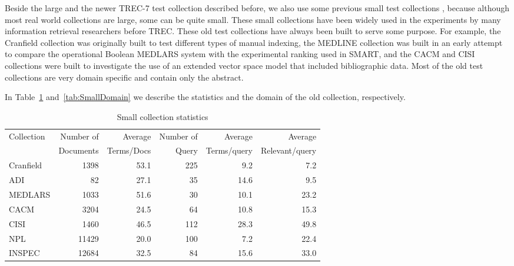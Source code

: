Beside the large and the newer TREC-7 test collection described before, we also use some previous small test collections \cite{fox90}, because although most real world collections are large, some can be quite small.  These small collections have been widely used in the experiments by many information retrieval researchers before TREC. These old test collections have always been built to serve some purpose. For example, the Cranfield collection was originally built to test different types of manual indexing, the MEDLINE collection was built in an early attempt to compare the operational Boolean MEDLARS system with the experimental ranking used in SMART, and the CACM and CISI collections were built to investigate the use of an extended vector space model that included bibliographic data. Most of the old test collections are very domain specific and contain only the abstract.

In Table~\ref{tab:SmallStat} and~\ref{tab:SmallDomain} we describe the statistics and the domain of the old collection, respectively.


\begin{table}[bht]
  \begin{center}
    \caption{Small collection  statistics}
    \vspace{3mm}
    \begin{tabular}{|l|r|r|r|r|r|} \hline
Collection & Number of & Average &   Number of & Average & Average\\
     & Documents & Terms/Docs& Query     &Terms/query & Relevant/query\\ \hline
Cranfield & 1398 & 53.1 & 225 & 9.2 &7.2 \\
ADI       & 82   & 27.1 & 35  & 14.6 &9.5\\
MEDLARS   & 1033 & 51.6 & 30  & 10.1 &23.2\\
CACM      & 3204 & 24.5 & 64  & 10.8 &15.3\\
CISI      & 1460 & 46.5 &112  & 28.3 &49.8\\
NPL       & 11429& 20.0 &100  & 7.2  &22.4\\
INSPEC    &12684&  32.5 & 84  & 15.6 &33.0\\ \hline
    \end{tabular}
    \label{tab:SmallStat}
  \end{center}
\end{table} 

